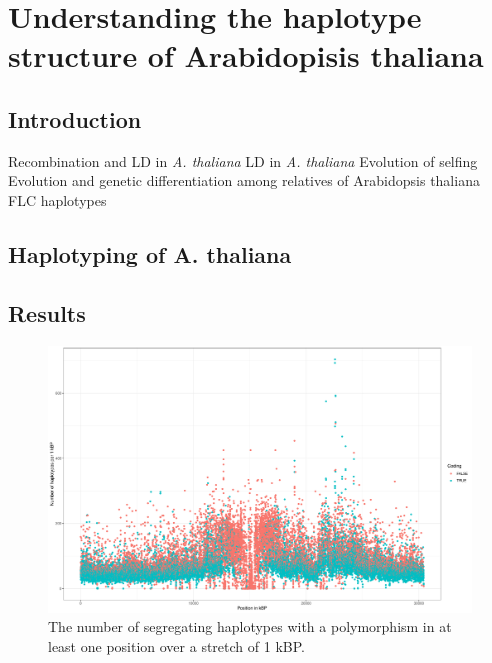 
\chapter{Understanding the haplotype structure of Arabidopisis thaliana } %

\label{Chapter1} %




\section{Introduction}

Recombination and LD in \textit{A. thaliana} \cite{kim2007recombination}
LD in \textit{A. thaliana} \cite{nordborg2002extent}
Evolution of selfing \cite{tang2007evolution}
Evolution and genetic differentiation among relatives of Arabidopsis thaliana \cite{koch2007evolution}
FLC haplotypes \cite{li2014multiple}



\section{Haplotyping of A. thaliana}

\section{Results}

\begin{figure}[th]
\centering
\includegraphics[height=.55\textheight, width=1.1\textwidth]{Figures/chr1_hap}
\decoRule
\caption[Haplotype strutcture of chromosome 1 of \textit{A. thaliana}]{The number of segregating haplotypes with a polymorphism in at least one position over a stretch of 1 kBP.}
\label{fig:chr1}
\end{figure}



